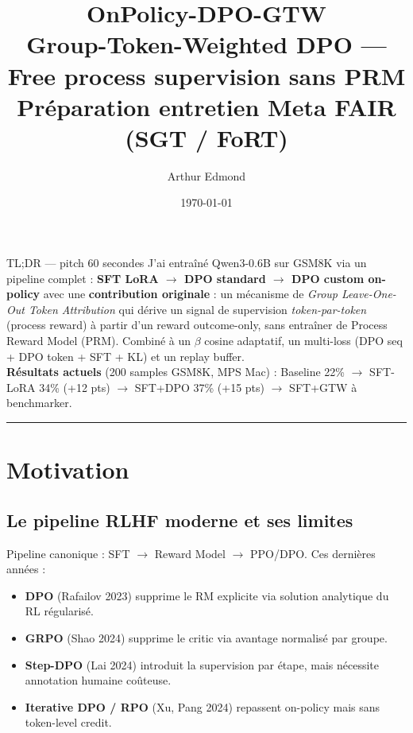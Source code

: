 \documentclass[10pt,a4paper]{article}
\title{\textbf{OnPolicy-DPO-GTW}\\
\large Group-Token-Weighted DPO --- Free process supervision sans PRM\\
\normalsize Préparation entretien Meta FAIR (SGT / FoRT)}
\author{Arthur Edmond}
\date{\today}
\begin{document}
\maketitle

\begin{intuit}{TL;DR --- pitch 60 secondes}
J'ai entraîné Qwen3-0.6B sur GSM8K via un pipeline complet : \textbf{SFT LoRA $\to$ DPO standard $\to$ DPO custom on-policy} avec une \textbf{contribution originale} : un mécanisme de \emph{Group Leave-One-Out Token Attribution} qui dérive un signal de supervision \emph{token-par-token} (process reward) à partir d'un reward outcome-only, sans entraîner de Process Reward Model (PRM). Combiné à un $\beta$ cosine adaptatif, un multi-loss (DPO seq + DPO token + SFT + KL) et un replay buffer. \\
\textbf{Résultats actuels} (200 samples GSM8K, MPS Mac) : Baseline 22\% $\to$ SFT-LoRA 34\% (+12 pts) $\to$ SFT+DPO 37\% (+15 pts) $\to$ SFT+GTW à benchmarker.
\end{intuit}

\tableofcontents
\bigskip\hrule\bigskip

\section{Motivation}

\subsection{Le pipeline RLHF moderne et ses limites}

Pipeline canonique : SFT $\to$ Reward Model $\to$ PPO/DPO. Ces dernières années :

\begin{itemize}[leftmargin=*]
  \item \textbf{DPO} (Rafailov 2023) supprime le RM explicite via solution analytique du RL régularisé.
  \item \textbf{GRPO} (Shao 2024) supprime le critic via avantage normalisé par groupe.
  \item \textbf{Step-DPO} (Lai 2024) introduit la supervision par étape, mais nécessite annotation humaine coûteuse.
  \item \textbf{Iterative DPO / RPO} (Xu, Pang 2024) repassent on-policy mais sans token-level credit.
\end{itemize}
\end{document}
